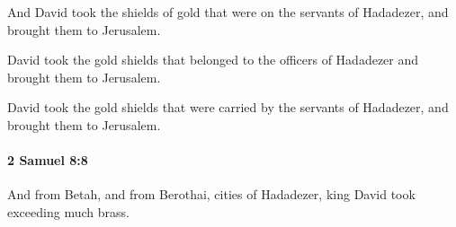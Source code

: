 			\begin{versebox}
					\item[BHS] 
					\item[ASV] And David took the shields of gold that were on the servants of Hadadezer, and brought them to Jerusalem.
					\item[NIV] David took the gold shields that belonged to the officers of Hadadezer and brought them to Jerusalem.
					\item[NRSV] David took the gold shields that were carried by the servants of Hadadezer, and brought them to Jerusalem.
			\end{versebox}

		\paragraph{2 Samuel 8:8} %
			\label{2SAMUEL-8-8}

			And from Betah, and from Berothai, cities of Hadadezer, king David took exceeding much brass.

